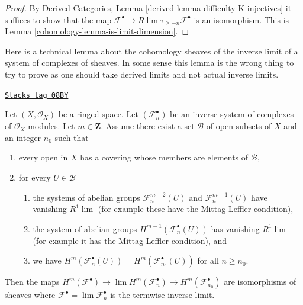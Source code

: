 \begin{proof}

By Derived Categories, Lemma \ref{derived-lemma-difficulty-K-injectives}
it suffices to show that the map
$\mathcal{F}^\bullet \to R\lim \tau_{\geq -n} \mathcal{F}^\bullet$
is an isomorphism. This is Lemma \ref{cohomology-lemma-is-limit-dimension}.
\end{proof}

Here is a technical lemma about the cohomology sheaves of the inverse
limit of a system of complexes of sheaves. In some sense this lemma
is the wrong thing to try to prove as one should take derived
limits and not actual inverse limits.

\begin{lemma}
\label{cohomology-lemma-inverse-limit-complexes}
\href{https://stacks.math.columbia.edu/tag/08BY}{\texttt{Stacks tag 08BY}}

Let $(X, \mathcal{O}_X)$ be a ringed space. Let $(\mathcal{F}_n^\bullet)$
be an inverse system of complexes of $\mathcal{O}_X$-modules.
Let $m \in \mathbf{Z}$. Assume there exist a set $\mathcal{B}$
of open subsets of $X$ and an integer $n_0$ such that
\begin{enumerate}
\item every open in $X$ has a covering whose members are
elements of $\mathcal{B}$,
\item for every $U \in \mathcal{B}$
\begin{enumerate}
\item the systems of abelian groups
$\mathcal{F}_n^{m - 2}(U)$ and $\mathcal{F}_n^{m - 1}(U)$
have vanishing $R^1\lim$ (for example these have the Mittag-Leffler
condition),
\item the system of abelian groups $H^{m - 1}(\mathcal{F}_n^\bullet(U))$
has vanishing $R^1\lim$ (for example it has the Mittag-Leffler condition), and
\item we have
$H^m(\mathcal{F}_n^\bullet(U)) = H^m(\mathcal{F}_{n_0}^\bullet(U))$
for all $n \geq n_0$.
\end{enumerate}
\end{enumerate}
Then the maps
$H^m(\mathcal{F}^\bullet) \to \lim H^m(\mathcal{F}_n^\bullet) \to
H^m(\mathcal{F}_{n_0}^\bullet)$
are isomorphisms of sheaves where
$\mathcal{F}^\bullet = \lim \mathcal{F}_n^\bullet$ is the termwise
inverse limit.
\end{lemma}

